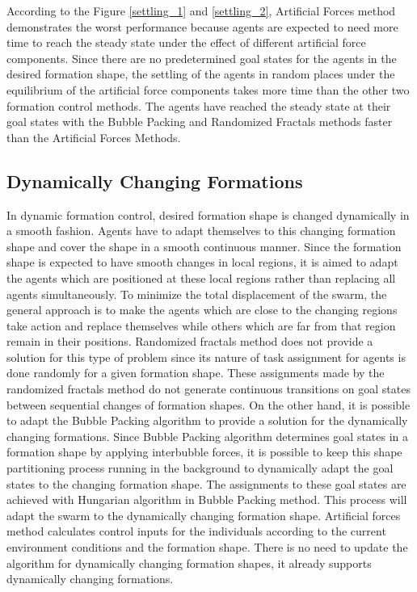According to the Figure \ref{settling_1} and \ref{settling_2}, Artificial Forces method demonstrates the worst performance because agents are expected to need more time to reach the steady state under the effect of different artificial force components. Since there are no predetermined goal states for the agents in the desired formation shape, the settling of the agents in random places under the equilibrium of the artificial force components takes more time than the other two formation control methods. The agents have reached the steady state at their goal states with the Bubble Packing and Randomized Fractals methods faster than the Artificial Forces Methods. 

\subsection{Dynamically Changing Formations} \label{dynamical_ref}
In dynamic formation control, desired formation shape is changed dynamically in a smooth fashion. Agents have to adapt themselves to this changing formation shape and cover the shape in a smooth continuous manner. Since the formation shape is expected to have smooth changes in local regions, it is aimed to adapt the agents which are positioned at these local regions rather than replacing all agents simultaneously. To minimize the total displacement of the swarm, the general approach is to make the agents which are close to the changing regions take action and replace themselves while others which are far from that region remain in their positions. Randomized fractals method does not provide a solution for this type of problem since its nature of task assignment for agents is done randomly for a given formation shape. These assignments made by the randomized fractals method do not generate continuous transitions on goal states between sequential changes of formation shapes. On the other hand, it is possible to adapt the Bubble Packing algorithm to provide a solution for the dynamically changing formations. Since Bubble Packing algorithm determines goal states in a formation shape by applying interbubble forces, it is possible to keep this shape partitioning process running in the background to dynamically adapt the goal states to the changing formation shape. The assignments to these goal states are achieved with Hungarian algorithm in Bubble Packing method. This process will adapt the swarm to the dynamically changing formation shape. Artificial forces method calculates control inputs for the individuals according to the current environment conditions and the formation shape. There is no need to update the algorithm for dynamically changing formation shapes, it already supports dynamically changing formations. 

